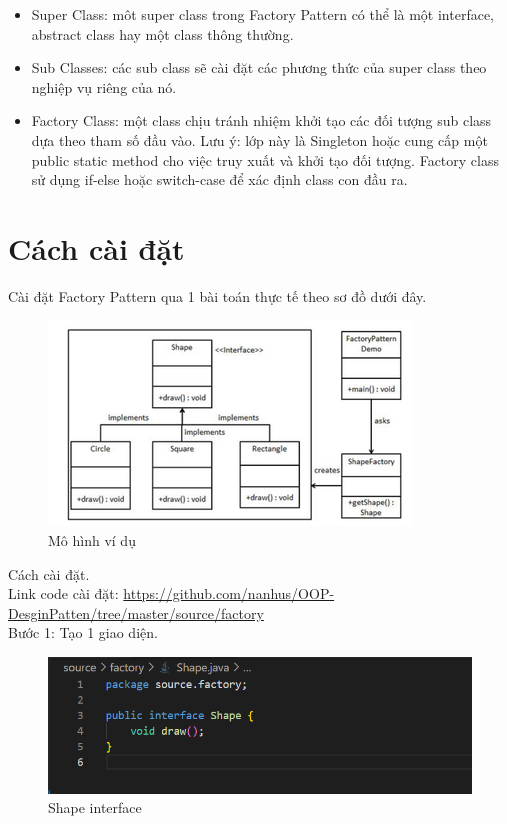 \begin{itemize}
    \item Super Class: môt super class trong Factory Pattern có thể là một interface, abstract class hay một class thông thường.
    \item Sub Classes: các sub class sẽ cài đặt các phương thức của super class theo nghiệp vụ riêng của nó.
    \item Factory Class: một class chịu tránh nhiệm khởi tạo các đối tượng sub class dựa theo tham số đầu vào. Lưu ý: lớp này là Singleton hoặc cung cấp một public static method cho việc truy xuất và khởi tạo đối tượng. Factory class sử dụng if-else hoặc switch-case để xác định class con đầu ra.
\end{itemize}
\section{Cách cài đặt}
Cài đặt Factory Pattern qua 1 bài toán thực tế theo sơ đồ dưới đây.

\begin{figure}[!htb]
    \centering
    \includegraphics[width=\textwidth]{fig/Factory/example_structure_factory.png}
    \caption{Mô hình ví dụ}
    \label{fig:example_structure_factory}
\end{figure}
Cách cài đặt.
\\Link code cài đặt:
\url{https://github.com/nanhus/OOP-DesginPatten/tree/master/source/factory}\\

Bước 1: Tạo 1 giao diện.
\begin{figure}[!htb]
    \centering
    \includegraphics[width=\textwidth]{fig/Factory/shape_class.png}
    \caption{Shape interface}
    \label{fig:shape_class}
\end{figure}

